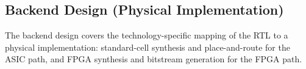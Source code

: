 \subsection{Backend Design (Physical Implementation)}
\label{sec:hw:backend}

The backend design covers the technology-specific mapping of the RTL to a physical implementation: standard-cell synthesis and place-and-route for the ASIC path, and FPGA synthesis and bitstream generation for the FPGA path.



